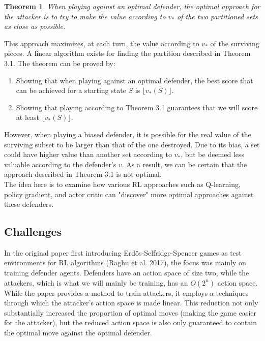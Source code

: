 \documentclass{article}
\theoremstyle{plain}
\newtheorem{thm}{Theorem}[section]
\theoremstyle{definition}
\theoremstyle{remark}
\newcommand{\floor}[1]{\lfloor #1 \rfloor}
\begin{document}
\begin{thm}
  When playing against an optimal defender, the optimal approach for the attacker is to try to make the value according to $v_{*}$ of the two partitioned sets as close as possible.
\end{thm}

This approach maximizes, at each turn, the value according to $v_{*}$ of the surviving pieces. A linear algorithm exists for finding the partition described in Theorem 3.1. The theorem can be proved by:
\begin{enumerate}
  \item Showing that when playing against an optimal defender, the best score that can be achieved for a starting state $S$ is $\floor{v_{*}(S)}$.
  \item Showing that playing according to Theorem 3.1 guarantees that we will score at least $\floor{v_{*}(S)}$.
\end{enumerate}

However, when playing a biased defender, it is possible for the real value of the surviving subset to be larger than that of the one destroyed. Due to its bias, a set could have higher value than another set according to $v_{*}$, but be deemed less valuable according to the defender's $v$. As a result, we can be certain that the approach described in Theorem 3.1 is not optimal.\\

The idea here is to examine how various RL approaches such as Q-learning, policy gradient, and actor critic can "discover" more optimal approaches against these defenders.

\subsection{Challenges}
In the original paper first introducing Erd\"os-Selfridge-Spencer games as test environments for RL algorithms (Raghu et al. 2017), the focus was mainly on training defender agents. Defenders have an action space of size two, while the attackers, which is what we will mainly be training, has an $O(2^n)$ action space.\\

While the paper provides a method to train attackers, it employs a techniques through which the attacker's action space is made linear. This reduction not only substantially increased the proportion of optimal moves (making the game easier for the attacker), but the reduced action space is also only guaranteed to contain the optimal move against the optimal defender. \\
\end{document}
